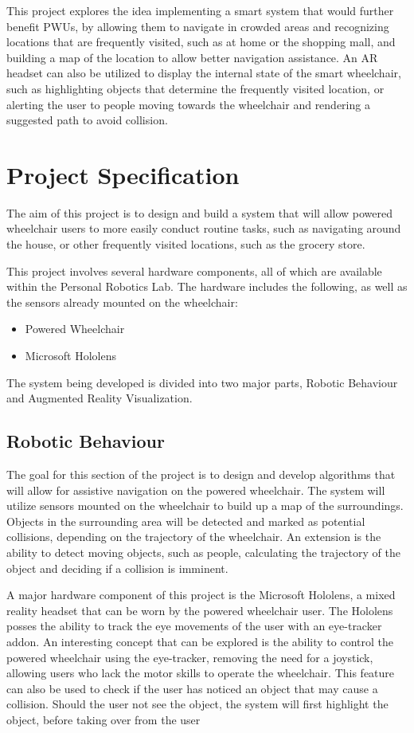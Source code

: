 \documentclass[12pt,a4paper]{report}
\begin{document}
This project explores the idea implementing a smart system that would further benefit PWUs, by allowing them to navigate in crowded areas and recognizing locations that are frequently visited, such as at home or the shopping mall, and building a map of the location to allow better navigation assistance. An AR headset can also be utilized to display the internal state of the smart wheelchair, such as highlighting objects that determine the frequently visited location, or alerting the user to people moving towards the wheelchair and rendering a suggested path to avoid collision.

\section{Project Specification} \label{Project_Spec}
The aim of this project is to design and build a system that will allow powered wheelchair users to more easily conduct routine tasks, such as navigating around the house, or other frequently visited locations, such as the grocery store.

This project involves several hardware components, all of which are available within the Personal Robotics Lab. The hardware includes the following, as well as the sensors already mounted on the wheelchair:

\begin{itemize}
	\item Powered Wheelchair
	\item Microsoft Hololens
\end{itemize}

The system being developed is divided into two major parts, Robotic Behaviour and Augmented Reality Visualization.

\subsection{Robotic Behaviour}
The goal for this section of the project is to design and develop algorithms that will allow for assistive navigation on the powered wheelchair. The system will utilize sensors mounted on the wheelchair to build up a map of the surroundings. Objects in the surrounding area will be detected and marked as potential collisions, depending on the trajectory of the wheelchair. An extension is the ability to detect moving objects, such as people, calculating the trajectory of the object and deciding if a collision is imminent.

A major hardware component of this project is the Microsoft Hololens, a mixed reality headset that can be worn by the powered wheelchair user. The Hololens posses the ability to track the eye movements of the user with an eye-tracker addon. An interesting concept that can be explored is the ability to control the powered wheelchair using the eye-tracker, removing the need for a joystick, allowing users who lack the motor skills to operate the wheelchair. This feature can also be used to check if the user has noticed an object that may cause a collision. Should the user not see the object, the system will first highlight the object, before taking over from the user 
\end{document}
